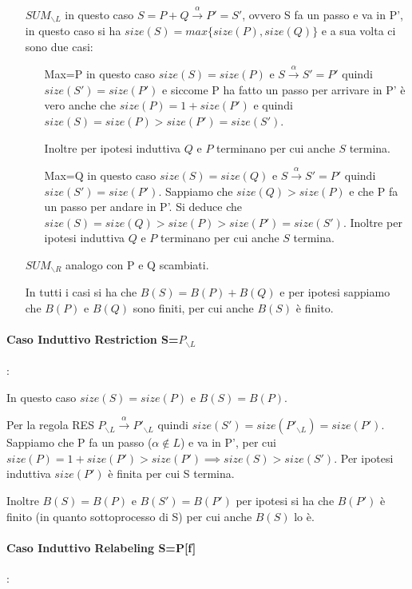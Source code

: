 \documentclass{article}
\newcommand{\pl}{P_{\backslash L}}
\newcommand{\pil}{P'_{\backslash L}}
\newcommand{\passo}{\xrightarrow{\alpha}}
\begin{document}
\begin{itemize}
    \item [$SUM_{\backslash L}$] in questo caso $S = P+Q \xrightarrow{\alpha} P' = S'$, ovvero S fa un passo e va in P', in questo caso si ha $size(S) = max\{size(P), size(Q)\}$ e a sua volta ci sono due casi:
    \begin{itemize}
        \item [Max=P] in questo caso $size(S) = size(P)$ e $S \passo S'=P'$ quindi $size(S')=size(P')$ e siccome P ha fatto un passo per arrivare in P' è vero anche che $size(P) = 1 + size(P')$ e quindi $size(S)=size(P)>size(P')=size(S')$. 
        
        Inoltre per ipotesi induttiva $Q$ e $P$ terminano per cui anche $S$ termina.
        
        \item[Max=Q] in questo caso $size(S) = size(Q)$ e  $S \passo S'=P'$ quindi $size(S')=size(P')$. Sappiamo che $size(Q)>size(P)$ e che P fa un passo per andare in P'. Si deduce che $size(S)=size(Q)>size(P)>size(P')=size(S')$.
        Inoltre per ipotesi induttiva $Q$ e $P$ terminano per cui anche $S$ termina.
        
    \end{itemize}
    
    \item [$SUM_{\backslash R} $] analogo con P e Q scambiati.
    
In tutti i casi si ha che $ B(S) =B(P) + B(Q) $ e per ipotesi sappiamo che $ B(P) $ e $ B(Q) $ sono finiti, per cui anche $ B(S) $ è finito.
\end{itemize}

\paragraph{Caso Induttivo Restriction S=$\pl$}:

In questo caso $size(S) = size(P)$ e $B(S)=B(P)$. 

Per la regola RES $\pl \passo \pil$ quindi $size(S')= size(\pil) =size(P')$. Sappiamo che P fa un passo ($\alpha \not\in L$) e va in P', per cui $size(P) = 1+ size(P')>size(P') \implies size(S)>size(S')$. Per ipotesi induttiva $size(P')$ è finita per cui S termina.

Inoltre $B(S) =B(P)$ e $B(S') =B(P')$ per ipotesi si ha che $B(P')$ è finito (in quanto sottoprocesso di S) per cui anche $B(S)$ lo è.

\paragraph{Caso Induttivo Relabeling S=P[f]}:
\end{document}
